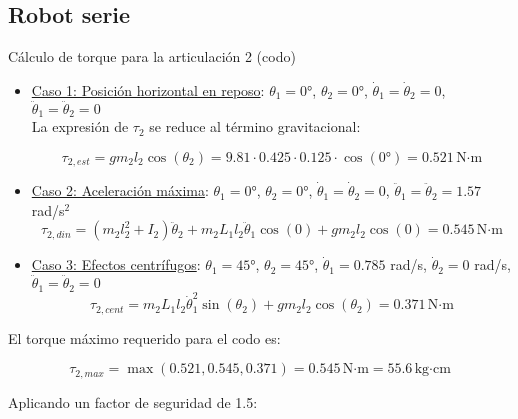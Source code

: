 
\subsection{Robot serie}
Cálculo de torque para la articulación 2 (codo)
\begin{itemize}[label=$\bullet$]
\item  \underline{Caso 1: Posición horizontal en reposo}: $\theta_1 = 0°$, $\theta_2 = 0°$, $\dot{\theta}_1 = \dot{\theta}_2 = 0$, $\ddot{\theta}_1 = \ddot{\theta}_2 = 0$\\

La expresión de $\tau_2$ se reduce al término gravitacional:

\begin{equation}
\tau_{2,est} = gm_2l_2\cos(\theta_2) = 9.81 \cdot 0.425 \cdot 0.125 \cdot \cos(0°) = 0.521 \, \text{N·m}
\end{equation}

\item  \underline{Caso 2: Aceleración máxima}: $\theta_1 = 0°$, $\theta_2 = 0°$, $\dot{\theta}_1 = \dot{\theta}_2 = 0$, $\ddot{\theta}_1 = \ddot{\theta}_2 = 1.57$ rad/s$^2$\\

\begin{equation}
\tau_{2,din} = (m_2l_2^2 + I_2)\ddot{\theta}_2 + m_2L_1l_2\ddot{\theta}_1\cos(0) + gm_2l_2\cos(0) = 0.545 \, \text{N·m}
\end{equation}

\item  \underline{Caso 3: Efectos centrífugos}: $\theta_1 = 45°$, $\theta_2 = 45°$, $\dot{\theta}_1 = 0.785$ rad/s, $\dot{\theta}_2 = 0$ rad/s, $\ddot{\theta}_1 = \ddot{\theta}_2 = 0$\\

\begin{equation}
\tau_{2,cent} = m_2L_1l_2\dot{\theta}_1^2\sin(\theta_2) + gm_2l_2\cos(\theta_2)  = 0.371 \, \text{N·m}
\end{equation}
\end{itemize}
El torque máximo requerido para el codo es:

\begin{equation}
\tau_{2,max} = \max(0.521, 0.545, 0.371) = 0.545 \, \text{N·m} = 55.6 \, \text{kg·cm}
\end{equation}

Aplicando un factor de seguridad de 1.5:

